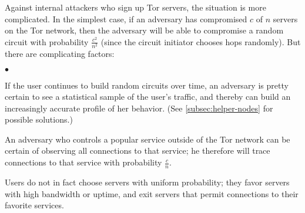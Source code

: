 \documentclass{llncs}
\newenvironment{tightlist}{\begin{list}{$\bullet$}{
  \setlength{\itemsep}{0mm}
    \setlength{\parsep}{0mm}
    }}{\end{list}}
\begin{document}
Against internal attackers who sign up Tor servers, the situation is more
complicated.  In the simplest case, if an adversary has compromised $c$ of
$n$ servers on the Tor network, then the adversary will be able to compromise
a random circuit with probability $\frac{c^2}{n^2}$ (since the circuit
initiator chooses hops randomly).  But there are
complicating factors:
\begin{tightlist}
\item If the user continues to build random circuits over time, an adversary
  is pretty certain to see a statistical sample of the user's traffic, and
  thereby can build an increasingly accurate profile of her behavior.  (See
  \ref{subsec:helper-nodes} for possible solutions.)
\item An adversary who controls a popular service outside of the Tor network
  can be certain of observing all connections to that service; he
  therefore will trace connections to that service with probability
  $\frac{c}{n}$.
\item Users do not in fact choose servers with uniform probability; they
  favor servers with high bandwidth or uptime, and exit servers that
  permit connections to their favorite services.
\end{tightlist}

%
\end{document}
